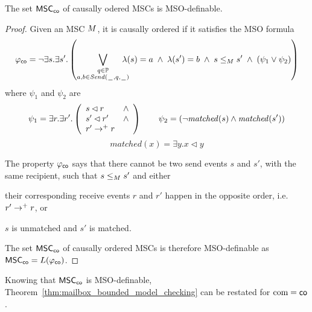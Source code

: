 \begin{proposition}\label{prop:co_mso}
	The set $\mathsf{MSC}_{\mathsf{co}}$ of causally odered MSCs is MSO-definable.
\end{proposition}
\begin{proof}
	Given an MSC $M$, it is causally ordered if it satisfies the MSO formula
	\[
	\varphi_{\mathsf{co}} =
	\neg \exists s.\exists s'. \left(
	\bigvee_{\substack{q \in \mathbb{P}\\a,b \in {\mathit{Send}(\hspace{0.1em}\underline{\hspace{0.5em}}\hspace{0.1em},q,\hspace{0.1em}\underline{\hspace{0.5em}}\hspace{0.1em})}}}\hspace{-1em}
	\lambda(s) = a \;\wedge\; \lambda(s') = b
	\;\wedge\; s \le_M s' \;\wedge\;
	(\psi_1 \vee \psi_2 ) 
	\right)
	\]
	where $\psi_1$ and $\psi_2$ are
	\[
	\psi_1 = \exists r.\exists r'.\left(
	\begin{array}{ll}
		s \lhd r & \wedge\\
		s' \lhd r' & \wedge\\
		r' \to^+ r &
	\end{array} 
	\right) \quad \quad
	\psi_2 = (\neg \mathit{matched}(s) \wedge \mathit{matched}(s'))
	\]
	\[
	matched(x) = \exists y. x \lhd y
	\]

	The property $\varphi_{\mathsf{co}}$ says that there cannot be two send events $s$ and $s'$, with the same recipient, such that $s \le_M s'$ and either
	\begin{enumerate*}[label={(\roman*)}]
		\item their corresponding receive events $r$ and $r'$ happen in the opposite order, i.e. $r' \to^+ r$, or
		\item $s$ is unmatched and $s'$ is matched.
	\end{enumerate*}
	The set $\mathsf{MSC}_{\mathsf{co}}$ of causally ordered MSCs is therefore MSO-definable as $\mathsf{MSC}_{\mathsf{co}}=L(\varphi_{\mathsf{co}})$.

\end{proof}

Knowing that $\mathsf{MSC}_{\mathsf{co}}$ is MSO-definable, Theorem~\ref{thm:mailbox_bounded_model_checking} can be restated for $\textup{com} = \mathsf{co}$.

